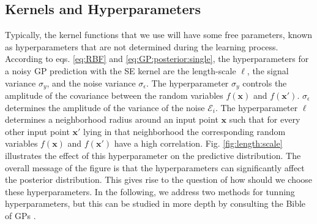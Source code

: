 \documentclass[10pt]{article}
\theoremstyle{definition}
\theoremstyle{definition}
\theoremstyle{remark}
\begin{document}
\subsection{Kernels and Hyperparameters}
Typically, the kernel functions that we use will have some free parameters, known as hyperparameters that are not determined during the learning process. According to eqs. \eqref{eq:RBF} and \eqref{eq:GP:posterior:single}, the hyperparameters for a noisy GP prediction with the SE kernel are the length-scale $\ell$, the signal variance $\sigma_y$, and the noise variance $\sigma_{\epsilon}$.  The hyperparameter $\sigma_y$ controls the amplitude of the covariance between the random variables $f(\mathbf{x})$ and $f(\mathbf{x}')$. $\sigma_{\epsilon}$ determines the amplitude of the variance of the noise $\mathcal{E}_i$. The hyperparameter $\ell$ determines a neighborhood radius around an input point $\mathbf{x}$ such that for every other input point $\mathbf{x}'$ lying in that neighborhood the corresponding random variables $f(\mathbf{x})$ and $f(\mathbf{x}')$ have a high correlation. Fig. \ref{fig:length:scale} illustrates the effect of this hyperparameter on the predictive distribution. The overall message of the figure is that the hyperparameters can significantly affect the posterior distribution. This gives rise to the question of how should we choose these hyperparameters. In the following, we address two methods for tunning hyperparameters, but this can be studied in more depth by consulting the Bible of GPs \cite[Chapter 5]{Rasmussen2006}.
\end{document}
